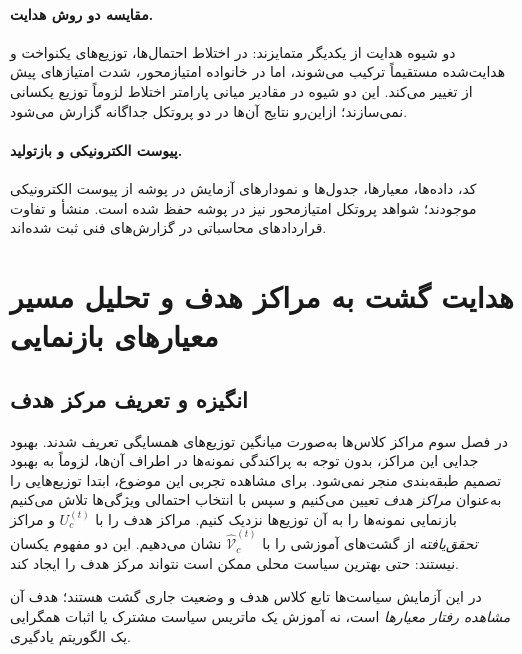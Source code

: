 \paragraph{مقایسه دو روش هدایت.}
دو شیوه هدایت از یکدیگر متمایزند: در اختلاط احتمال‌ها،
توزیع‌های یکنواخت و هدایت‌شده مستقیماً ترکیب می‌شوند، اما
در خانواده امتیازمحور، شدت امتیازهای پیش از 
تغییر می‌کند. این دو شیوه در مقادیر میانی پارامتر اختلاط
لزوماً توزیع یکسانی نمی‌سازند؛ ازاین‌رو نتایج آن‌ها
در دو پروتکل جداگانه گزارش می‌شود.

\paragraph{پیوست الکترونیکی و بازتولید.}
کد، داده‌ها، معیارها، جدول‌ها و نمودارهای آزمایش  در پوشه  از پیوست الکترونیکی موجودند؛ شواهد پروتکل امتیازمحور نیز در پوشه  حفظ شده است. منشأ و تفاوت قراردادهای محاسباتی در گزارش‌های فنی ثبت شده‌اند.

\section{هدایت گشت به مراکز هدف و تحلیل مسیر معیارهای بازنمایی}
\label{sec:ch4-center-target-observation}

\subsection{انگیزه و تعریف مرکز هدف}
\label{subsec:ch4-center-observation-motivation}
در فصل سوم مراکز کلاس‌ها به‌صورت میانگین توزیع‌های همسایگی تعریف شدند. بهبود جدایی این مراکز، بدون توجه به پراکندگی نمونه‌ها در اطراف آن‌ها، لزوماً به بهبود تصمیم طبقه‌بندی منجر نمی‌شود. برای مشاهده تجربی این موضوع، ابتدا توزیع‌هایی را به‌عنوان \emph{مراکز هدف} تعیین می‌کنیم و سپس با انتخاب احتمالی ویژگی‌ها تلاش می‌کنیم بازنمایی نمونه‌ها را به آن توزیع‌ها نزدیک کنیم. مراکز هدف را با $U_c^{(t)}$ و مراکز \emph{تحقق‌یافته} از گشت‌های آموزشی را با $\widehat{\mathcal V}_c^{(t)}$ نشان می‌دهیم. این دو مفهوم یکسان نیستند: حتی بهترین سیاست محلی ممکن است نتواند مرکز هدف را ایجاد کند.

در این آزمایش سیاست‌ها تابع کلاس هدف و وضعیت جاری گشت هستند؛ هدف آن \emph{مشاهده رفتار معیارها} است، نه آموزش یک ماتریس سیاست مشترک یا اثبات همگرایی یک الگوریتم یادگیری.

